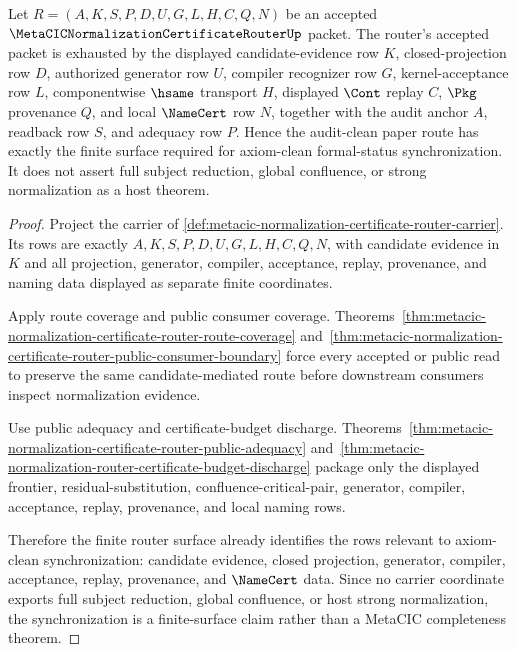 \begin{theorem}
\label{thm:metacic-normalization-certificate-router-axiom-clean-sync}
Let $R=(A,K,S,P,D,U,G,L,H,C,Q,N)$ be an accepted $\MetaCICNormalizationCertificateRouterUp$ packet. The router's accepted packet is exhausted by the displayed candidate-evidence row $K$, closed-projection row $D$, authorized generator row $U$, compiler recognizer row $G$, kernel-acceptance row $L$, componentwise $\hsame$ transport $H$, displayed $\Cont$ replay $C$, $\Pkg$ provenance $Q$, and local $\NameCert$ row $N$, together with the audit anchor $A$, readback row $S$, and adequacy row $P$. Hence the audit-clean paper route has exactly the finite surface required for axiom-clean formal-status synchronization. It does not assert full subject reduction, global confluence, or strong normalization as a host theorem.
\end{theorem}
\begin{proof}
Project the carrier of \autoref{def:metacic-normalization-certificate-router-carrier}. Its rows are exactly $A,K,S,P,D,U,G,L,H,C,Q,N$, with candidate evidence in $K$ and all projection, generator, compiler, acceptance, replay, provenance, and naming data displayed as separate finite coordinates.

Apply route coverage and public consumer coverage. Theorems~\ref{thm:metacic-normalization-certificate-router-route-coverage} and~\ref{thm:metacic-normalization-certificate-router-public-consumer-boundary} force every accepted or public read to preserve the same candidate-mediated route before downstream consumers inspect normalization evidence.

Use public adequacy and certificate-budget discharge. Theorems~\ref{thm:metacic-normalization-certificate-router-public-adequacy} and~\ref{thm:metacic-normalization-router-certificate-budget-discharge} package only the displayed frontier, residual-substitution, confluence-critical-pair, generator, compiler, acceptance, replay, provenance, and local naming rows.

Therefore the finite router surface already identifies the rows relevant to axiom-clean synchronization: candidate evidence, closed projection, generator, compiler, acceptance, replay, provenance, and $\NameCert$ data. Since no carrier coordinate exports full subject reduction, global confluence, or host strong normalization, the synchronization is a finite-surface claim rather than a MetaCIC completeness theorem.
\end{proof}

